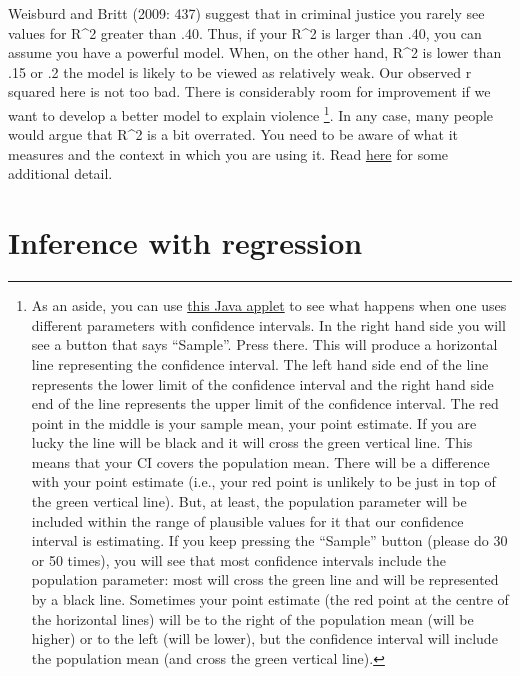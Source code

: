 \documentclass[
]{book}
\begin{document}
Weisburd and Britt (2009: 437) suggest that in criminal justice you rarely see values for R\^{}2 greater than .40. Thus, if your R\^{}2 is larger than .40, you can assume you have a powerful model. When, on the other hand, R\^{}2 is lower than .15 or .2 the model is likely to be viewed as relatively weak. Our observed r squared here is not too bad. There is considerably room for improvement if we want to develop a better model to explain violence \footnote{As an aside, you can use \href{http://bcs.whfreeman.com/ips4e/cat_010/applets/confidenceinterval.html}{this Java applet} to see what happens when one uses different parameters with confidence intervals. In the right hand side you will see a button that says ``Sample''. Press there. This will produce a horizontal line representing the confidence interval. The left hand side end of the line represents the lower limit of the confidence interval and the right hand side end of the line represents the upper limit of the confidence interval. The red point in the middle is your sample mean, your point estimate. If you are lucky the line will be black and it will cross the green vertical line. This means that your CI covers the population mean. There will be a difference with your point estimate (i.e., your red point is unlikely to be just in top of the green vertical line). But, at least, the population parameter will be included within the range of plausible values for it that our confidence interval is estimating. If you keep pressing the ``Sample'' button (please do 30 or 50 times), you will see that most confidence intervals include the population parameter: most will cross the green line and will be represented by a black line. Sometimes your point estimate (the red point at the centre of the horizontal lines) will be to the right of the population mean (will be higher) or to the left (will be lower), but the confidence interval will include the population mean (and cross the green vertical line).}. In any case, many people would argue that R\^{}2 is a bit overrated. You need to be aware of what it measures and the context in which you are using it. Read \href{http://blog.minitab.com/blog/adventures-in-statistics/how-high-should-r-squared-be-in-regression-analysis}{here} for some additional detail.

\hypertarget{inference-with-regression}{%
\section{Inference with regression}\label{inference-with-regression}}
\end{document}
